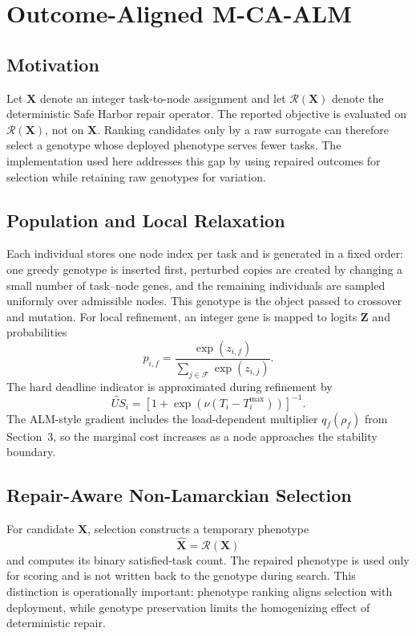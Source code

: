 \documentclass[pdflatex,sn-mathphys-num]{sn-jnl}
\begin{document}
\section{Outcome-Aligned M-CA-ALM}

\subsection{Motivation}
Let $\mathbf{X}$ denote an integer task-to-node assignment and let $\mathcal{R}(\mathbf{X})$ denote the deterministic Safe Harbor repair operator. The reported objective is evaluated on $\mathcal{R}(\mathbf{X})$, not on $\mathbf{X}$. Ranking candidates only by a raw surrogate can therefore select a genotype whose deployed phenotype serves fewer tasks. The implementation used here addresses this gap by using repaired outcomes for selection while retaining raw genotypes for variation.

\subsection{Population and Local Relaxation}
Each individual stores one node index per task and is generated in a fixed order: one greedy genotype is inserted first, perturbed copies are created by changing a small number of task--node genes, and the remaining individuals are sampled uniformly over admissible nodes. This genotype is the object passed to crossover and mutation. For local refinement, an integer gene is mapped to logits $\mathbf{Z}$ and probabilities
\begin{equation}
 p_{i,f}=\frac{\exp(z_{i,f})}{\sum_{j\in\mathcal{F}}\exp(z_{i,j})}.
\end{equation}
The hard deadline indicator is approximated during refinement by
\begin{equation}
 \widetilde{US}_i=\left[1+\exp\left(\nu(T_i-T_i^{\max})\right)\right]^{-1}.
\end{equation}
The ALM-style gradient includes the load-dependent multiplier $q_f(\rho_f)$ from Section~3, so the marginal cost increases as a node approaches the stability boundary.

\subsection{Repair-Aware Non-Lamarckian Selection}
For candidate $\mathbf{X}$, selection constructs a temporary phenotype
\begin{equation}
 \widehat{\mathbf{X}}=\mathcal{R}(\mathbf{X})
\end{equation}
and computes its binary satisfied-task count. The repaired phenotype is used only for scoring and is not written back to the genotype during search. This distinction is operationally important: phenotype ranking aligns selection with deployment, while genotype preservation limits the homogenizing effect of deterministic repair.
\end{document}
